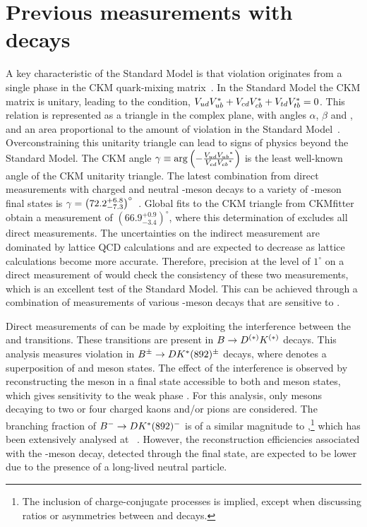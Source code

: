 \section{Previous \Pgamma measurements with \decay{\Bpm}{\D\Kstarpm} decays}

A key characteristic of the Standard Model is that \CP violation originates from a single phase in the CKM quark-mixing matrix~\cite{Cabibbo,KM}. In the Standard Model the CKM matrix is unitary, leading to the condition, ${V_{{u}{d}}}{V_{{u}{b}}^\ast} + {V_{{c}{d}}}{V_{{c}{b}}^\ast} + {V_{{t}{d}}}{V_{{t}{b}}^\ast} = 0$. This relation is represented as a triangle in the complex plane, with angles $\alpha$, $\beta$ and \Pgamma, and an area proportional to the amount of \CP violation in the Standard Model~\cite{CKMtriangle}. Overconstraining this unitarity triangle can lead to signs of physics beyond the Standard Model. The CKM angle $\gamma \equiv \arg\left(-\frac{{V_{{u}{d}}}{{V_{{u}{b}}}}^*}{{V_{{c}{d}}}{{V_{{c}{b}}}}^*}\right)$ is the least well-known angle of the CKM unitarity triangle. The latest \lhcb combination from direct measurements with charged and neutral \B-meson decays to a variety of \D-meson final states is $\gamma = \left(72.2^{+6.8}_{-7.3}\right)^{\circ}$~\cite{LHCB-PAPER-2016-032}. Global fits to the CKM triangle from CKMfitter~\cite{CKMfitter} obtain a \Pgamma measurement of $(66.9^{+0.9}_{-3.4})^{\circ}$, where this determination of \Pgamma excludes all direct measurements. The uncertainties on the indirect measurement are dominated by lattice QCD calculations and are expected to decrease as lattice calculations become more accurate. Therefore, precision at the level of $1^\circ$ on a direct measurement of \Pgamma would check the consistency of these two measurements, which is an excellent test of the Standard Model. This can be achieved through a combination of measurements of various \B-meson decays that are sensitive to \Pgamma.

Direct measurements of \Pgamma can be made by exploiting the interference between the \decay{\bquark}{\cquark\uquarkbar\squark} and \decay{\bquark}{\uquark\cquarkbar\squark} transitions. These transitions are present in ${B} \rightarrow {\ensuremath{D}}^{(*)}{K}^{(*)}$ decays. This analysis measures \CP violation in ${B}^\pm \rightarrow {\ensuremath{D}} {\ensuremath{{K}^*}}(892)^\pm$ decays, where \D denotes a superposition of \Dz and \Dzb meson states. The effect of the interference is observed by reconstructing the \D meson in a final state accessible to both \Dz and \Dzb meson states, which gives sensitivity to the weak phase \Pgamma. For this analysis, only \D mesons decaying to two or four charged kaons and/or pions are considered. The branching fraction of ${B}^- \rightarrow {\ensuremath{D}} {\ensuremath{{K}^*}}(892)^-$ is of a similar magnitude to \decay{\Bm}{\D\Km},\footnote{The inclusion of charge-conjugate processes is implied, except when discussing ratios or asymmetries between \Bp and \Bm decays.} which has been extensively analysed at \lhcb~\cite{LHCB-PAPER-2016-003, LHCB-PAPER-2014-041, LHCB-PAPER-2015-014}. However, the reconstruction efficiencies associated with the \Kstarm-meson decay, detected through the \KS\pim final state, are expected to be lower due to the presence of a long-lived neutral particle. %

